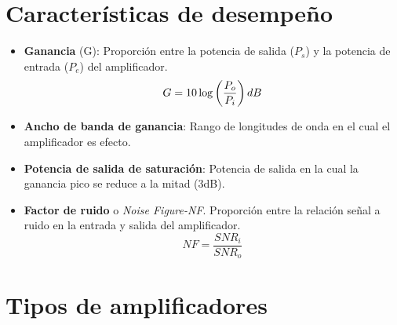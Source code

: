 \documentclass[
	12pt, %
	fleqn, %
	a4paper, %
	oneside, %
]{LegrandOrangeBook}
\begin{document}
\section{Características de desempeño}
\begin{itemize}
\item \textbf{Ganancia} (G): Proporción entre la potencia de salida ($P_s$) y la potencia de entrada ($P_e$) del amplificador.
\begin{equation}
G=10\log\left(\frac{P_o}{P_i}\right) dB
\end{equation}
\item \textbf{Ancho de banda de ganancia}: Rango de longitudes de onda en el cual el amplificador es efecto.
\item \textbf{Potencia de salida de saturación}: Potencia de salida en la cual la ganancia pico se reduce a la mitad (3dB).
\item \textbf{Factor de ruido} o \textit{Noise Figure-NF}. Proporción entre la relación señal a ruido en la entrada y salida del amplificador.
\begin{equation}
NF=\frac{SNR_i}{SNR_o}
\end{equation}
\end{itemize}
\section{Tipos de amplificadores}
\end{document}

